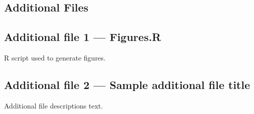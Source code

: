\documentclass{bmcart}
\begin{document}
\begin{backmatter}

\section*{Additional Files}
  \subsection*{Additional file 1 --- Figures.R}
    R script used to generate figures. 

  \subsection*{Additional file 2 --- Sample additional file title}
    Additional file descriptions text.


\end{backmatter}
\end{document}
